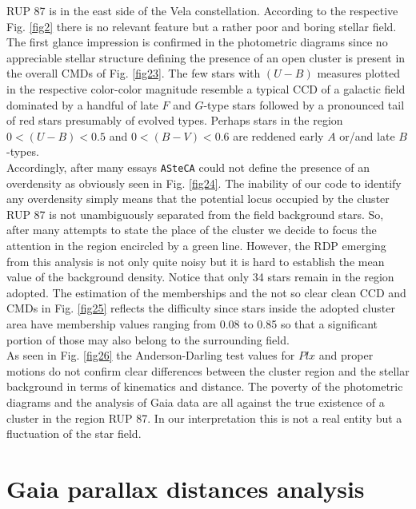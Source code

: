 \documentclass[draft]{aa}
\begin{document}
RUP 87 is in the east side of the Vela constellation. According to the
respective Fig. \ref{fig2} there is no relevant feature but a rather poor and
boring stellar field. The first glance impression is confirmed in the
photometric diagrams since no appreciable stellar structure
defining the presence of an open cluster is present in the overall CMDs of Fig.
\ref{fig23}. The few stars with $(U-B)$ measures plotted in the respective
color-color magnitude resemble a typical CCD of a galactic field dominated by a
handful of late $F$ and $G$-type stars followed by a pronounced tail of red
stars presumably of evolved types. Perhaps stars in the region $0<(U-B)<0.5$
and $0<(B-V)<0.6$ are reddened early $A$ or/and late $B$-types.\\

Accordingly, after many essays \texttt{ASteCA} could not define the presence of
an overdensity as obviously seen in Fig. \ref{fig24}. The inability of our code
to identify any overdensity simply means that the potential locus occupied by
the cluster RUP 87 is not unambiguously separated from the field background
stars. So, after many attempts to state the place of the cluster we decide to
focus the attention in the region encircled by a green line. However, the RDP
emerging from this analysis is not only quite noisy but it is hard to establish
the mean value of the background density. Notice that only 34 stars remain in
the region adopted. The estimation of the memberships and the not so clear clean
CCD and CMDs in Fig. \ref{fig25} reflects the difficulty since stars inside the
adopted cluster area have membership values ranging from 0.08 to 0.85 so that
a significant portion of those may also belong to the surrounding field.\\

As seen in Fig. \ref{fig26} the Anderson-Darling test values for $Plx$ and
proper motions do not confirm clear differences between the cluster region and
the stellar background in terms of kinematics and distance. The poverty of the
photometric diagrams and the analysis of Gaia data are all against the true
existence of a cluster in the region RUP 87. In our interpretation this is
not a real entity but a fluctuation of the star field.





\section{Gaia parallax distances analysis}
\label{sec:gaia_distances}
\end{document}
